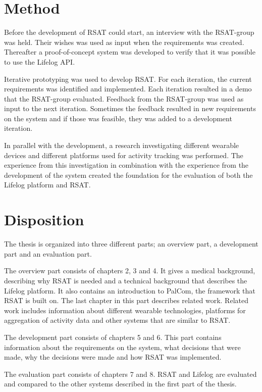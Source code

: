 \documentclass{cslthse-msc}
\begin{document}
\section{Method}
Before the development of RSAT could start, an interview with the RSAT-group was held. Their wishes was used as input when the requirements was created. Thereafter a proof-of-concept system was developed to verify that it was possible to use the Lifelog API.

Iterative prototyping was used to develop RSAT. For each iteration, the current requirements was identified and implemented. Each iteration resulted in a demo that the RSAT-group evaluated. Feedback from the RSAT-group was used as input to the next iteration. Sometimes the feedback resulted in new requirements on the system and if those was feasible, they was added to a development iteration.  

In parallel with the development, a research investigating different wearable devices and different platforms used for activity tracking was performed. The experience from this investigation in combination with the experience from the development of the system created the foundation for the evaluation of both the Lifelog platform and RSAT.



\section{Disposition}
The thesis is organized into three different parts; an overview part, a development part and an evaluation part. 

The overview part consists of chapters 2, 3 and 4. It gives a medical background, describing why RSAT is needed and a technical background that describes the Lifelog platform. It also contains an introduction to PalCom, the framework that RSAT is built on. The last chapter in this part describes related work. Related work includes information about different wearable technologies, platforms for aggregation of activity data and other systems that are similar to RSAT. 

The development part consists of chapters 5 and 6. This part contains information about the requirements on the system, what decisions that were made, why the decisions were made and how RSAT was implemented.

The evaluation part consists of chapters 7 and 8. RSAT and Lifelog are evaluated and compared to the other systems described in the first part of the thesis. 
\end{document}
